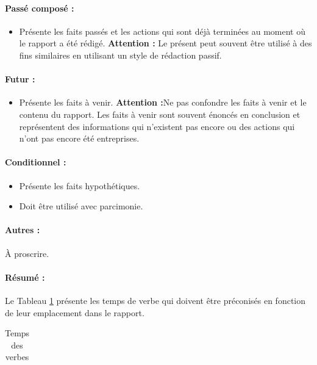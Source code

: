 \documentclass[12pt]{article} 	%
\begin{document}
{\paragraph{{\bfseries{Passé composé :}}}
\begin{itemize}
    \item    Présente les faits passés et les actions qui sont déjà terminées au moment où le rapport a été rédigé. {\bfseries{Attention :}} Le présent peut souvent être utilisé à des fins similaires en utilisant un style de rédaction passif.
\end{itemize}

\paragraph{{\bfseries{Futur :}}}
\begin{itemize}
    \item   Présente les faits à venir. {\bfseries{Attention :}}Ne pas confondre les faits à venir et le contenu du rapport. Les faits à venir sont souvent énoncés en conclusion et représentent des informations qui n’existent pas encore ou des actions qui n’ont pas encore été entreprises.
\end{itemize}

\paragraph{{\bfseries{Conditionnel :}}}
\begin{itemize}
    \item   Présente les faits hypothétiques.
    \item   Doit être utilisé avec parcimonie. 
\end{itemize}

\paragraph{{\bfseries{Autres :}}}
À proscrire.

\paragraph{{\bfseries{Résumé :}}}
Le Tableau \ref{tab1} présente les temps de verbe qui doivent être préconisés en fonction de leur emplacement dans le rapport.

\begin{table}[!h]
\caption{Temps des verbes} 
\label{tab1}
\centering
\hspace*{\fill}
\def\arraystretch{1.75}%
\centering
\begin{tabular}{ @{}lll}


\end{tabular}
\end{table}}
\end{document}
